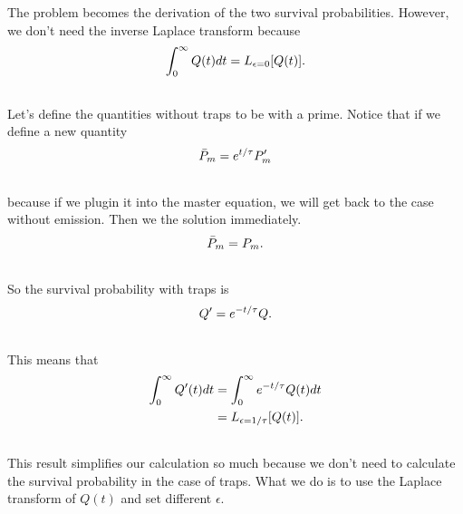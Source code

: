 \documentclass[letterpaper,10pt,english]{sphinxmanual}
\begin{document}
The problem becomes the derivation of the two survival probabilities. However, we don't need the inverse Laplace transform because
\begin{gather}
\begin{split}\int_0^\infty Q(t) dt = L_{\epsilon=0}[Q(t)] .\end{split}\notag\\\begin{split}\end{split}\notag
\end{gather}
Let's define the quantities without traps to be with a prime. Notice that if we define a new quantity
\begin{gather}
\begin{split}\bar P_m = e^{t/\tau} P_m'\end{split}\notag\\\begin{split}\end{split}\notag
\end{gather}
because if we plugin it into the master equation, we will get back to the case without emission. Then we the solution immediately.
\begin{gather}
\begin{split}\bar P_m = P_m.\end{split}\notag\\\begin{split}\end{split}\notag
\end{gather}
So the survival probability with traps is
\begin{gather}
\begin{split}Q' = e^{-t/\tau} Q.\end{split}\notag\\\begin{split}\end{split}\notag
\end{gather}
This means that
\begin{gather}
\begin{split}\int_0^\infty Q'(t) dt &= \int_0^\infty e^{-t/\tau} Q(t) dt \\
& = L_{\epsilon=1/\tau} [Q(t)].\end{split}\notag\\\begin{split}\end{split}\notag
\end{gather}
This result simplifies our calculation so much because we don't need to calculate the survival probability in the case of traps. What we do is to use the Laplace transform of $Q(t)$ and set different $\epsilon$.
\end{document}
